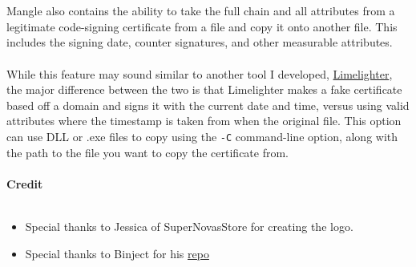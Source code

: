 \documentclass{article}
\begin{document}
\\
\\
Mangle also contains the ability to take the full chain and all attributes from a legitimate code-signing certificate from a file and copy it onto another file. This includes the signing date, counter signatures, and other measurable attributes.\\
\\
While this feature may sound similar to another tool I developed, \href{https://github.com/Tylous/Limelighter}{Limelighter}, the major difference between the two is that Limelighter makes a fake certificate based off a domain and signs it with the current date and time, versus using valid attributes where the timestamp is taken from when the original file. This option can use DLL or .exe files to copy using the \verb|-C| command-line option, along with the path to the file you want to copy the certificate from.\\
\\
{\noindent \LARGE \textbf{Credit}}\\\\
\begin{itemize}
	\item Special thanks to Jessica of SuperNovasStore for creating the logo.
	\item Special thanks to Binject for his \href{https://github.com/Binject/debug}{repo}
\end{itemize}
\end{document}
